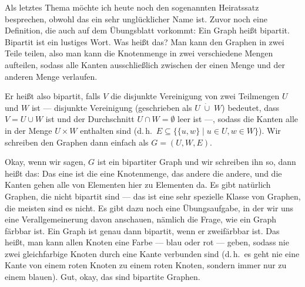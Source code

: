 \begin{spoken-clean}[00:54:05 - 00:55:02]
Als letztes Thema möchte ich heute noch den sogenannten Heiratssatz besprechen, obwohl das ein sehr unglücklicher Name ist. Zuvor noch eine Definition, die auch auf dem Übungsblatt vorkommt: Ein Graph heißt bipartit. Bipartit ist ein lustiges Wort. Was heißt das? Man kann den Graphen in zwei Teile teilen, also man kann die Knotenmenge in zwei verschiedene Mengen aufteilen, sodass alle Kanten ausschließlich zwischen der einen Menge und der anderen Menge verlaufen.

Er heißt also bipartit, falls $V$ die disjunkte Vereinigung von zwei Teilmengen $U$ und $W$ ist --- disjunkte Vereinigung (geschrieben als $U \;\dot{\cup}\; W$) bedeutet, dass $V = U \cup W$ ist und der Durchschnitt $U \cap W = \emptyset$ leer ist ---, sodass die Kanten alle in der Menge $U \times W$ enthalten sind (d.\,h.\ $E \subseteq \{\{u, w\} \mid u \in U, w \in W\}$). Wir schreiben den Graphen dann einfach als $G = (U, W, E)$.

Okay, wenn wir sagen, $G$ ist ein bipartiter Graph und wir schreiben ihn so, dann heißt das: Das eine ist die eine Knotenmenge, das andere die andere, und die Kanten gehen alle von Elementen hier zu Elementen da. Es gibt natürlich Graphen, die nicht bipartit sind --- das ist eine sehr spezielle Klasse von Graphen, die meisten sind es nicht. Es gibt dazu noch eine Übungsaufgabe, in der wir uns eine Verallgemeinerung davon anschauen, nämlich die Frage, wie ein Graph färbbar ist. Ein Graph ist genau dann bipartit, wenn er zweifärbbar ist. Das heißt, man kann allen Knoten eine Farbe --- blau oder rot --- geben, sodass nie zwei gleichfarbige Knoten durch eine Kante verbunden sind (d.\,h.\ es geht nie eine Kante von einem roten Knoten zu einem roten Knoten, sondern immer nur zu einem blauen). Gut, okay, das sind bipartite Graphen.
\end{spoken-clean}


